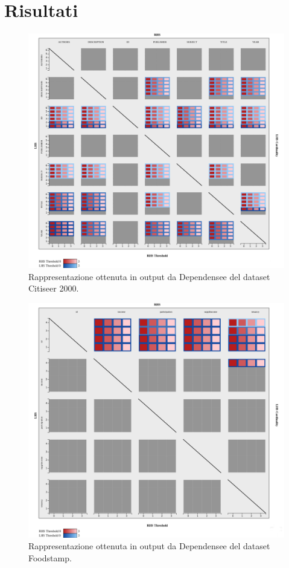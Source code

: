 \section{Risultati}
\begin{figure}[ht]
    \centering
    \includegraphics[width=\linewidth]{capitoli/figure/citiseer_2000_result}
    \caption{Rappresentazione ottenuta in output da Dependensee del dataset Citiseer 2000.}
    \label{fig:citiseer_2000_result}
\end{figure}
\begin{figure}[ht]
    \centering
    \includegraphics[width=\linewidth]{capitoli/figure/foodstamp_result}
    \caption{Rappresentazione ottenuta in output da Dependensee del dataset Foodstamp.}
    \label{fig:foodstamp_result}
\end{figure}
